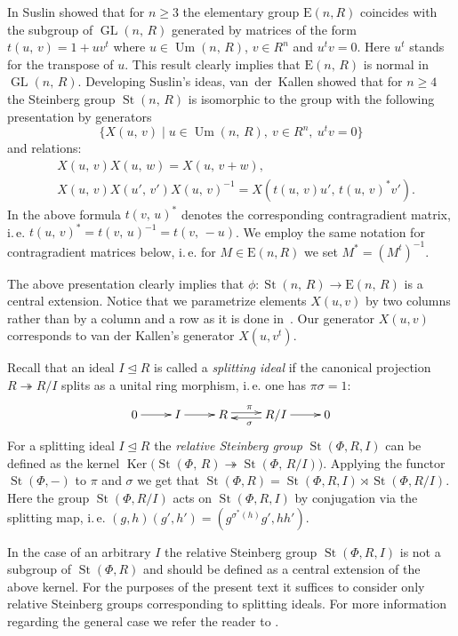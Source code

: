 \documentclass[11pt]{amsart}
\theoremstyle{plain} \declaretheorem[name=Theorem, Refname={Theorem,Theorems}]{tm} \Crefname{tm}{Theorem}{Theorems}
\numberwithin{equation}{section}
\theoremstyle{definition} \newtheorem{df}[lm]{Definition} \Crefname{df}{Definition}{Definitions}
\theoremstyle{remark} \newtheorem{rk}[lm]{Remark} \Crefname{rk}{Remark}{Remarks}
\newcommand{\Ker}{\mathop{\mathrm{Ker}}\nolimits}
\newcommand{\E}{{\mathrm{E}}}
\newcommand{\Um}{\mathop{\mathrm{Um}}\nolimits}
\newcommand{\St}{\mathop{\mathrm{St}}\nolimits}
\newcommand{\GL}{\mathop{\mathrm{GL}}\nolimits}
\newcommand{\epi}{\twoheadrightarrow}
\newcommand{\inv}{^{-1}}
\begin{document}
In \cite{Sus} Suslin showed that for $n\geq 3$ the elementary group $\E(n, R)$ coincides with the subgroup of $\GL(n,\,R)$ generated by matrices
of the form $t(u,\,v)=1+uv^t$ where $u\in\Um(n,\,R)$, $v\in R^n$ and $u^tv=0$. Here $u^t$ stands for the transpose of $u$.
This result clearly implies that $\E(n,\,R)$ is normal in $\GL(n,\,R)$.
Developing Suslin's ideas, van~der~Kallen showed that for $n\geq4$ the Steinberg group $\St(n,\,R)$ is isomorphic to the group with the following presentation by generators
$$\{X(u,\,v)\mid u\in\Um(n,\,R),\ v\in R^n,\ u^tv=0\}$$ and relations:
\setcounter{equation}{0} \renewcommand{\theequation}{K\arabic{equation}}
\begin{align}
&X(u,\,v)X(u,\,w)=X(u,\,v+w), \label{add1} \\
&X(u,\,v)X(u',\,v')X(u,\,v)\inv=X(t(u,\,v)u',\,t(u,\,v)^* v'). \label{conj1}
\end{align}
In the above formula $t(v,\,u)^*$ denotes the corresponding contragradient matrix, i.\,e. $t(u,\,v)^* = t(v,\,u)\inv = t(v,\,-u)$.
We employ the same notation for contragradient matrices below, i.\,e. for $M\in\E(n,R)$ we set $M^* = (M^t)\inv$.

The above presentation clearly implies that $\phi\colon\St(n,\,R)\rightarrow\E(n,\,R)$ is a central extension.
Notice that we parametrize elements $X(u, v)$ by two columns rather than by a column and a row as it is done in~\cite{vdK}.
Our generator $X(u,v)$ corresponds to van der Kallen's generator $X(u, v^t)$.

Recall that an ideal $I\trianglelefteq R$ is called a \emph{splitting ideal} if the canonical projection $R \twoheadrightarrow R/I$ splits as a unital ring morphism, i.\,e. one has $\pi\sigma=1$:
$$\xymatrix{0\ar@<0.1ex>[r]^{}&I\ar@<0.1ex>[r]^{}&R\ar@<0.5ex>[r]^{\pi}&R/I\ar@<0.5ex>[l]^{\sigma}\ar@<0.1ex>[r]^{}&0}$$
For a splitting ideal $I\trianglelefteq R$ the \emph{relative Steinberg group} $\St(\Phi, R, I)$ can be defined as the kernel $\Ker\big(\St(\Phi,\,R)\epi\St(\Phi,\,R/I)\big)$.
Applying the functor $\St(\Phi, -)$ to $\pi$ and $\sigma$ we get that $\St(\Phi, R) = \St(\Phi, R, I) \rtimes \St(\Phi, R/I)$.
Here the group $\St(\Phi, R/I)$ acts on $\St(\Phi, R, I)$ by conjugation via the splitting map, i.\,e. $(g, h) (g',h') = (g {}^{\sigma^*(h)}g', hh')$.

In the case of an arbitrary $I$ the relative Steinberg group $\St(\Phi, R, I)$ is not a subgroup of $\St(\Phi, R)$ and should be defined as a central extension of the above kernel.
For the purposes of the present text it suffices to consider only relative Steinberg groups corresponding to splitting ideals.
For more information regarding the general case we refer the reader to \cite[Section~3]{SCh}.
\end{document}
